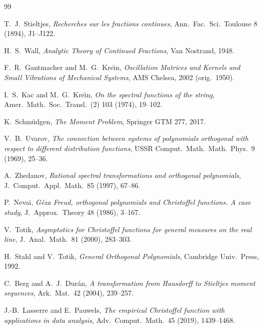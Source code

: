 \documentclass[11pt]{amsart}
\theoremstyle{definition}
\theoremstyle{remark}
\begin{document}
\begin{thebibliography}{99}

 T.~J.~Stieltjes,
\emph{Recherches sur les fractions continues},
Ann.\ Fac.\ Sci.\ Toulouse 8 (1894), J1--J122. %

 H.~S.~Wall,
\emph{Analytic Theory of Continued Fractions},
Van Nostrand, 1948. %

 F.~R.~Gantmacher and M.~G.~Kre\u{\i}n,
\emph{Oscillation Matrices and Kernels and Small Vibrations of Mechanical
Systems}, AMS Chelsea, 2002 (orig.\ 1950). %

 I.~S.~Kac and M.~G.~Kre\u{\i}n,
\emph{On the spectral functions of the string},
Amer.\ Math.\ Soc.\ Transl.\ (2) 103 (1974), 19--102. %

 K.~Schm\"udgen,
\emph{The Moment Problem}, Springer GTM 277, 2017. %

 V.~B.~Uvarov,
\emph{The connection between systems of polynomials orthogonal with respect
to different distribution functions},
USSR Comput.\ Math.\ Math.\ Phys.\ 9 (1969), 25--36. %

 A.~Zhedanov,
\emph{Rational spectral transformations and orthogonal polynomials},
J.\ Comput.\ Appl.\ Math.\ 85 (1997), 67--86. %

 P.~Nevai,
\emph{G\'eza Freud, orthogonal polynomials and Christoffel functions. A case
study}, J.\ Approx.\ Theory 48 (1986), 3--167. %

 V.~Totik,
\emph{Asymptotics for Christoffel functions for general measures on the real
line}, J.\ Anal.\ Math.\ 81 (2000), 283--303. %

 H.~Stahl and V.~Totik,
\emph{General Orthogonal Polynomials},
Cambridge Univ.\ Press, 1992. %

 C.~Berg and A.~J.~Dur\'an,
\emph{A transformation from Hausdorff to Stieltjes moment sequences},
Ark.\ Mat.\ 42 (2004), 239--257. %

 J.-B.~Lasserre and E.~Pauwels,
\emph{The empirical Christoffel function with applications in data
analysis}, Adv.\ Comput.\ Math.\ 45 (2019), 1439--1468. %


\end{thebibliography}
\end{document}

